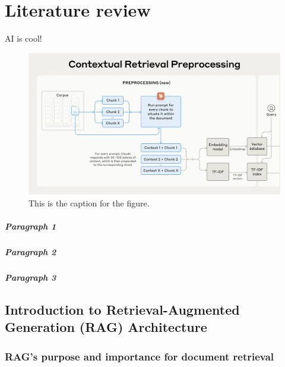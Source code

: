 \chapter{Literature review}
AI is cool!

\begin{figure}[htbp]
    \centering
    \includegraphics[width=\linewidth]{figures/Contextual_Ret_preprocessing.png} %
    \caption{This is the caption for the figure.\cite{anthropic2024contextual}}
    \label{fig:your_label} %
\end{figure}

\paragraph{Paragraph 1} \lipsum[2]

\paragraph{Paragraph 2} \lipsum[2]

\paragraph{Paragraph 3} \lipsum[2]
\lipsum[]

\section{Introduction to Retrieval-Augmented Generation (RAG) Architecture}
\lipsum[1]

\subsection{RAG's purpose and importance for document retrieval}
\lipsum[2]

